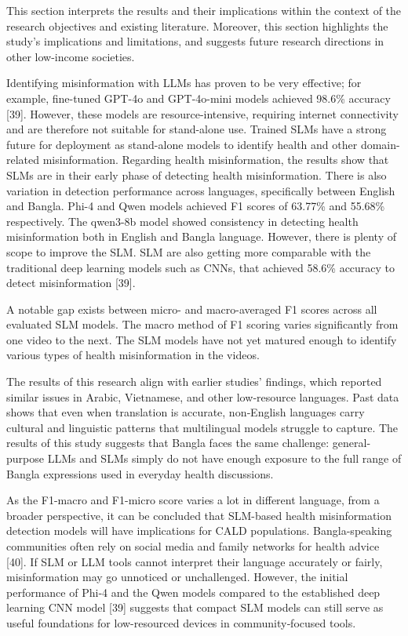 \documentclass[]{article}
\begin{document}
This section interprets the results and their implications within the context of the research
objectives and existing literature. Moreover, this section highlights the study's implications
and limitations, and suggests future research directions in other low-income societies.

Identifying misinformation with LLMs has proven to be very effective;
for example, fine-tuned GPT-4o and GPT-4o-mini models achieved 98.6\%
accuracy {[}39{]}. However, these models are resource-intensive,
requiring internet connectivity and are therefore not suitable for
stand-alone use. Trained SLMs have a strong future for deployment as
stand-alone models to identify health and other domain-related
misinformation.
Regarding health misinformation, the results show that SLMs are in their early phase of detecting health misinformation.
There is also variation in detection performance across languages,
specifically between English and Bangla. Phi-4 and Qwen models
achieved F1 scores of 63.77\% and 55.68\% respectively. The qwen3-8b model showed consistency in detecting health
misinformation both in English and Bangla language. However, there is
plenty of scope to improve the SLM. SLM are also getting more comparable
with the traditional deep learning models such as CNNs, that achieved
58.6\% accuracy to detect misinformation {[}39{]}.

A notable gap exists between micro- and macro-averaged F1 scores
across all evaluated SLM models. The macro method of F1 scoring varies
significantly from one video to the next. The SLM models have not yet
matured enough to identify various types of health misinformation in the
videos.

The results of this research align with earlier studies' findings, which reported similar issues
in Arabic, Vietnamese, and other low‑resource languages. Past data shows that even when
translation is accurate, non‑English languages carry cultural and
linguistic patterns that multilingual models struggle to capture. The results of this study suggests that Bangla faces the same challenge: general-purpose
LLMs and SLMs simply do not have enough exposure to the full range of
Bangla expressions used in everyday health discussions.

As the F1-macro and F1-micro score varies a lot in different language,
from a broader perspective, it can be concluded that SLM-based health
misinformation detection models will have implications for CALD
populations. Bangla-speaking communities often rely on social media and
family networks for health advice {[}40{]}. If SLM or LLM tools cannot
interpret their language accurately or fairly, misinformation may go
unnoticed or unchallenged. However, the initial performance of Phi‑4 and
the Qwen models compared to the established deep learning CNN model
{[}39{]} suggests that compact SLM models can still serve as useful
foundations for low-resourced devices in community‑focused tools.
\end{document}
